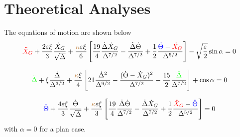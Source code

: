 \documentclass[fleqn,10pt]{InternshipReport_SI-ENS-PSL}
\begin{document}
\flushbottom %

\maketitle %

\thispagestyle{empty} %








\section*{Theoretical Analyses}


The equations of motion are shown below \cite{JFM2015}
$$ \textcolor{red}{\ddot{X}_G} + \frac{2\varepsilon \xi}{3} \frac{\dot{X}_G}{\sqrt\Delta} + \frac{\textcolor{brown}{\kappa} \varepsilon \xi}{6} \left[ \frac{19}{4} \frac{\dot\Delta \dot{X}_G}{\Delta^{7/2}} - \frac{\dot\Delta \dot\Theta}{\Delta^{7/2}} + \frac{1}{2} \frac{\textcolor{blue}{\ddot{\Theta}} - \textcolor{red}{\ddot{X}_G}}{\Delta^{5/2}} \right] - \sqrt{\frac{\varepsilon}{2}} \sin\alpha = 0 $$

$$ \textcolor{green}{\ddot{\Delta}} + \xi \frac{\dot{\Delta}}{\Delta^{3/2}} + \frac{\textcolor{brown}{\kappa} \xi}{4} \left[ 21 \frac{\dot{\Delta}^2}{\Delta^{9/2}} - \frac{(\dot\Theta - \dot{X}_G)^2}{\Delta^{7/2}} - \frac{15}{2} \frac{\textcolor{green}{\ddot{\Delta}}}{\Delta^{7/2}} \right] + \cos\alpha = 0  $$

$$ \textcolor{blue}{\ddot{\Theta}} + \frac{4\varepsilon\xi}{3} \frac{\dot\Theta}{\sqrt\Delta} + \frac{\textcolor{brown}{\kappa} \varepsilon \xi}{3} \left[ \frac{19}{4} \frac{\dot\Delta \dot\Theta}{\Delta^{7/2}} - \frac{\dot\Delta \dot{X}_G}{\Delta^{7/2}} + \frac{1}{2} \frac{\textcolor{red}{\ddot{X}_G} - \textcolor{blue}{\ddot{\Theta}}}{\Delta^{5/2}} \right] = 0  $$
with $\alpha=0$ for a plan case.
\end{document}
